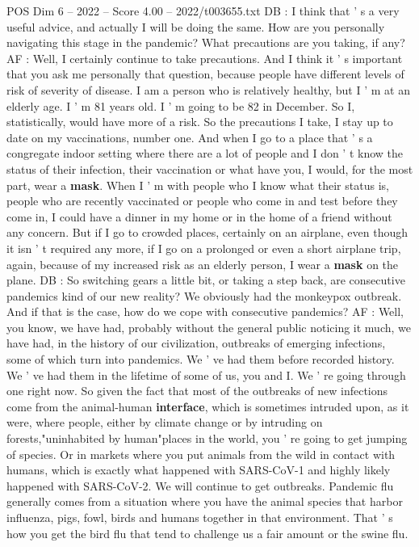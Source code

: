 \begin{textsample}{POS Dim 6 – 2022 – Score 4.00 – 2022/t003655.txt}
DB : I think that ' s a very useful advice, and actually I will be doing the same.
How are you personally navigating this stage in the pandemic?
What precautions are you taking, if any?
AF : Well, I certainly continue to take precautions.
And I think it ' s important that you ask me personally that question, because people have different levels of risk of severity of disease.
I am a person who is relatively healthy, but I ' m at an elderly age.
I ' m 81 years old.
I ' m going to be 82 in December.
So I, statistically, would have more of a risk.
So the precautions I take, I stay up to date on my vaccinations, number one.
And when I go to a place that ' s a congregate indoor setting where there are a lot of people and I don ' t know the status of their infection, their vaccination or what have you, I would, for the most part, wear a \textbf{mask}.
When I ' m with people who I know what their status is, people who are recently vaccinated or people who come in and test before they come in, I could have a dinner in my home or in the home of a friend without any concern.
But if I go to crowded places, certainly on an airplane, even though it isn ' t required any more, if I go on a prolonged or even a short airplane trip, again, because of my increased risk as an elderly person, I wear a \textbf{mask} on the plane.
DB : So switching gears a little bit, or taking a step back, are consecutive pandemics kind of our new reality?
We obviously had the monkeypox outbreak.
And if that is the case, how do we cope with consecutive pandemics?
AF : Well, you know, we have had, probably without the general public noticing it much, we have had, in the history of our civilization, outbreaks of emerging infections, some of which turn into pandemics.
We ' ve had them before recorded history.
We ' ve had them in the lifetime of some of us, you and I.
We ' re going through one right now.
So given the fact that most of the outbreaks of new infections come from the animal-human \textbf{interface}, which is sometimes intruded upon, as it were, where people, either by climate change or by intruding on forests,"uninhabited by human"places in the world, you ' re going to get jumping of species.
Or in markets where you put animals from the wild in contact with humans, which is exactly what happened with SARS-CoV-1 and highly likely happened with SARS-CoV-2.
We will continue to get outbreaks.
Pandemic flu generally comes from a situation where you have the animal species that harbor influenza, pigs, fowl, birds and humans together in that environment.
That ' s how you get the bird flu that tend to challenge us a fair amount or the swine flu.

\end{textsample}
